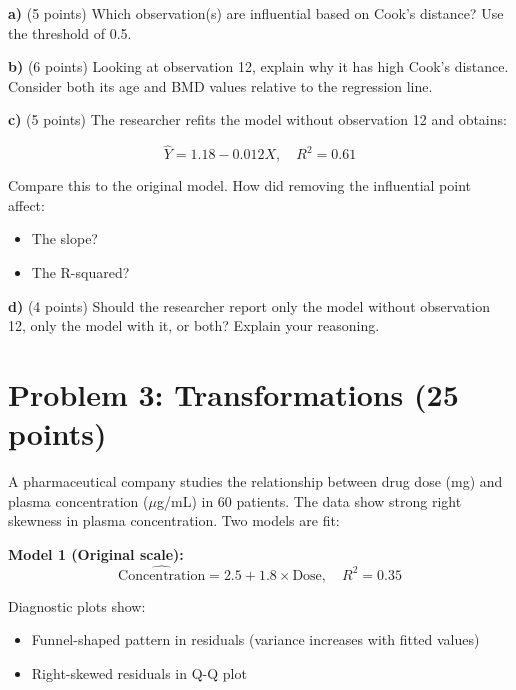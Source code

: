 \documentclass[11pt]{article}
\begin{document}
\vspace{0.3cm}

\textbf{a)} (5 points) Which observation(s) are influential based on Cook's distance? Use the threshold of 0.5.

\vspace{2cm}

\textbf{b)} (6 points) Looking at observation 12, explain why it has high Cook's distance. Consider both its age and BMD values relative to the regression line.

\vspace{3cm}

\textbf{c)} (5 points) The researcher refits the model without observation 12 and obtains:

$$\hat{Y} = 1.18 - 0.012X, \quad R^2 = 0.61$$

Compare this to the original model. How did removing the influential point affect:
\begin{itemize}
\item The slope?
\item The R-squared?
\end{itemize}

\vspace{3cm}

\textbf{d)} (4 points) Should the researcher report only the model without observation 12, only the model with it, or both? Explain your reasoning.

\vspace{3cm}

\newpage

\section*{Problem 3: Transformations (25 points)}

A pharmaceutical company studies the relationship between drug dose (mg) and plasma concentration ($\mu$g/mL) in 60 patients. The data show strong right skewness in plasma concentration. Two models are fit:

\textbf{Model 1 (Original scale):}
$$\widehat{\text{Concentration}} = 2.5 + 1.8 \times \text{Dose}, \quad R^2 = 0.35$$

Diagnostic plots show:
\begin{itemize}
\item Funnel-shaped pattern in residuals (variance increases with fitted values)
\item Right-skewed residuals in Q-Q plot
\end{itemize}
\end{document}
